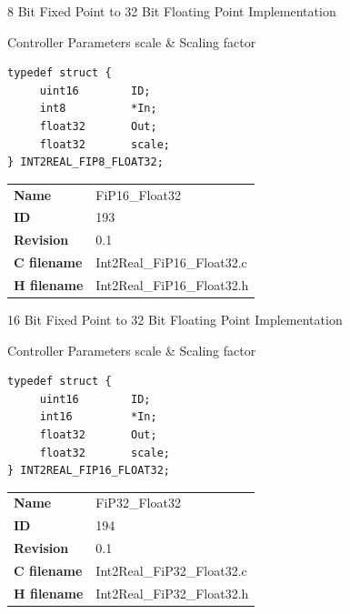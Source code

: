 8 Bit Fixed Point to 32 Bit Floating Point Implementation

\begin{XtoCtabular}{Controller Parameters}
scale & Scaling factor\tabularnewline
\hline
\end{XtoCtabular}

\begin{lstlisting}
typedef struct {
     uint16        ID;
     int8          *In;
     float32       Out;
     float32       scale;
} INT2REAL_FIP8_FLOAT32;
\end{lstlisting}

\ifdefined \AddTestReports
{}
\fi
{}
\nopagebreak[0]
\begin{tabular}{l l}
\textbf{Name} & FiP16\_Float32 \tabularnewline
\textbf{ID} & 193 \tabularnewline
\textbf{Revision} & 0.1 \tabularnewline
\textbf{C filename} & Int2Real\_FiP16\_Float32.c \tabularnewline
\textbf{H filename} & Int2Real\_FiP16\_Float32.h \tabularnewline
\end{tabular}
\vspace{1ex}

16 Bit Fixed Point to 32 Bit Floating Point Implementation

\begin{XtoCtabular}{Controller Parameters}
scale & Scaling factor\tabularnewline
\hline
\end{XtoCtabular}

\begin{lstlisting}
typedef struct {
     uint16        ID;
     int16         *In;
     float32       Out;
     float32       scale;
} INT2REAL_FIP16_FLOAT32;
\end{lstlisting}

\ifdefined \AddTestReports
{}
\fi
{}
\nopagebreak[0]
\begin{tabular}{l l}
\textbf{Name} & FiP32\_Float32 \tabularnewline
\textbf{ID} & 194 \tabularnewline
\textbf{Revision} & 0.1 \tabularnewline
\textbf{C filename} & Int2Real\_FiP32\_Float32.c \tabularnewline
\textbf{H filename} & Int2Real\_FiP32\_Float32.h \tabularnewline
\end{tabular}
\vspace{1ex}

